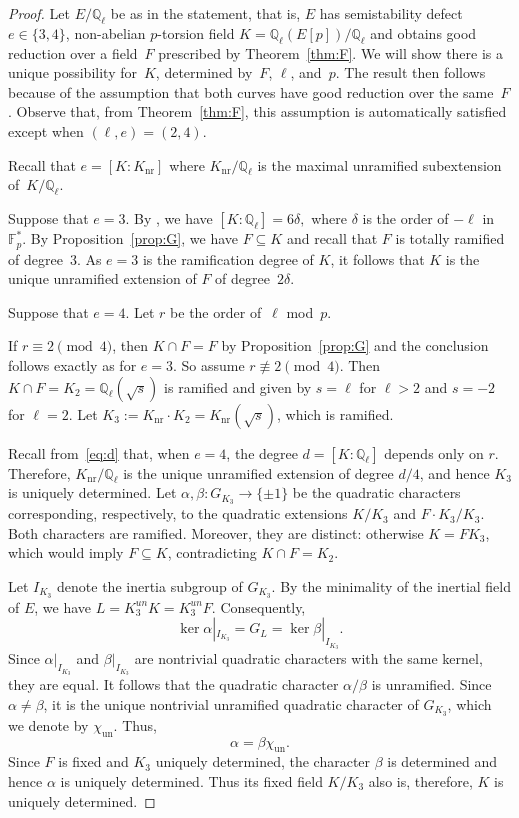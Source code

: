 \documentclass[12pt]{amsart}
\numberwithin{equation}{section}
\theoremstyle{definition}
\newcommand{\F}{\mathbb{F}}
\newcommand{\Q}{\mathbb{Q}}
\newcommand{\Knr}{K_{\text{nr}}}
\begin{document}
\begin{proof}
	Let $E/\Q_\ell$ be as in the statement, that is,
    $E$ has semistability defect $e \in \{3,4\} $, non-abelian
    $p$-torsion field $K=\Q_\ell(E[p])/\Q_\ell$ and obtains good reduction over a field~$F$ prescribed by Theorem~\ref{thm:F}.
We will show there is a unique possibility for~$K$, determined by~$F$, $\ell$, and~$p$.
The result then follows because of the assumption that both curves have good reduction over the same~$F$.
    Observe that, from Theorem~\ref{thm:F}, this assumption is automatically satisfied  except when $(\ell,e) = (2,4)$.

   Recall that $e=[K : \Knr]$ where $\Knr/\Q_\ell$ is the maximal unramified subextension of~$K/\Q_\ell$.

    Suppose that $e=3$. By \cite[Theorem 4.11]{torsf}, we have $[K:\Q_\ell]=6\delta,$ where $\delta$ is the order of
    $-\ell$ in $\F_p^*$. By Proposition~\ref{prop:G}, we have $F \subseteq K$ and recall that $F$ is totally ramified of degree~$3$. As $e=3$ is the ramification degree of $K$, it follows that
    $K$ is the unique unramified extension of $F$ of degree~$2\delta$.

   Suppose that $e=4$. Let $r$ be the order of~$\ell$ mod~$p$.

   If $r \equiv 2 \pmod 4$, then $K \cap F = F$ by Proposition~\ref{prop:G} and the conclusion follows exactly as for $e=3$. So assume $r \not\equiv 2 \pmod 4$. Then $K \cap F = K_2 = \Q_\ell(\sqrt{s})$ is ramified and given by $s=\ell$ for $\ell > 2$ and $s=-2$ for $\ell=2$.
Let $K_3:=\Knr \cdot K_2= \Knr(\sqrt{s})$, which is ramified. 

Recall from~\eqref{eq:d} that, when $e=4$, the degree
$d=[K:\Q_\ell]$
depends only on $r$. Therefore, $K_{\mathrm{nr}}/\Q_\ell$ is the unique
unramified extension of degree $d/4$, and hence $K_3$ is uniquely
determined.
Let
$ \alpha,\beta:G_{K_3}\to\{\pm1\}
$ 
be the quadratic characters corresponding, respectively, to the
quadratic extensions $K/K_3$ and $F \cdot K_3/K_3$. Both characters are ramified. Moreover, they are distinct: otherwise
$K=FK_3$, which would imply $F\subseteq K$, contradicting $K\cap F=K_2.$

Let $I_{K_3}$ denote the inertia subgroup of $G_{K_3}$. By the
minimality of the inertial field of $E$, we have
$  L=K_3^{un} K
     =K_3^{un} F.$
Consequently,
\[
    \ker \alpha|_{I_{K_3}}
    =
    G_L
    =
    \ker\beta|_{I_{K_3}}.
\]
Since $\alpha|_{I_{K_3}}$ and $\beta|_{I_{K_3}}$ are nontrivial
quadratic characters with the same kernel, they are equal. It follows
that the quadratic character $\alpha/\beta$
is unramified. Since $\alpha\neq\beta$, it is the unique nontrivial
unramified quadratic character of $G_{K_3}$, which we denote by $\chi_{\mathrm{un}}$.
Thus,
\[
    \alpha=\beta\chi_{\mathrm{un}}.
\]
 Since $F$ is fixed and $K_3$ uniquely determined, the character 
 $\beta$ is determined and hence $\alpha$ is uniquely determined. Thus its fixed field $K/K_3$ also is, therefore, $K$ is uniquely determined.
\end{proof}
\end{document}

